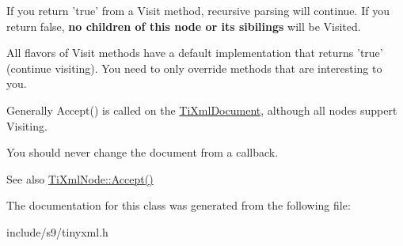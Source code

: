 \-If you return 'true' from a \-Visit method, recursive parsing will continue. \-If you return false, {\bfseries no children of this node or its sibilings} will be \-Visited.

\-All flavors of \-Visit methods have a default implementation that returns 'true' (continue visiting). \-You need to only override methods that are interesting to you.

\-Generally \-Accept() is called on the \hyperlink{classTiXmlDocument}{\-Ti\-Xml\-Document}, although all nodes suppert \-Visiting.

\-You should never change the document from a callback.

\begin{DoxySeeAlso}{\-See also}
\hyperlink{classTiXmlNode_acc0f88b7462c6cb73809d410a4f5bb86}{\-Ti\-Xml\-Node\-::\-Accept()} 
\end{DoxySeeAlso}


\-The documentation for this class was generated from the following file\-:\begin{DoxyCompactItemize}
\item 
include/s9/tinyxml.\-h\end{DoxyCompactItemize}

